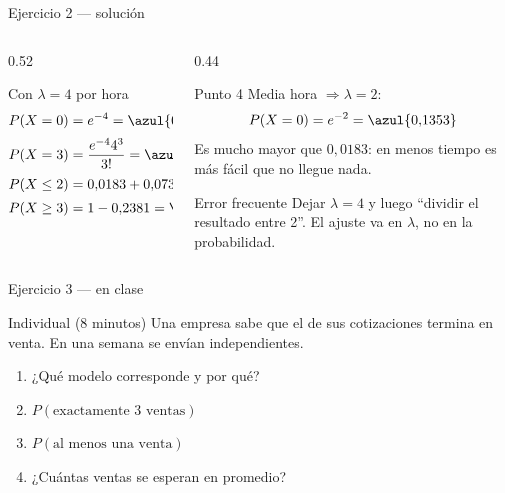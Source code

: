 \documentclass[aspectratio=169,10pt]{beamer}
\begin{document}
\begin{frame}{Ejercicio 2 — solución}
  \begin{columns}[T,onlytextwidth]
    \begin{column}{0.52\textwidth}
      \begin{block}{Con $\lambda=4$ por hora}
        \footnotesize
        \begin{align*}
          P(X=0)&=e^{-4}=\azul{0{,}0183}\\[0.2em]
          P(X=3)&=\frac{e^{-4}4^{3}}{3!}=\azul{0{,}1954}\\[0.2em]
          P(X\le 2)&=0{,}0183+0{,}0733+0{,}1465=\azul{0{,}2381}\\[0.2em]
          P(X\ge 3)&=1-0{,}2381=\azul{0{,}7619}
        \end{align*}
      \end{block}
    \end{column}
    \begin{column}{0.44\textwidth}
      \begin{exampleblock}{Punto 4}
        \footnotesize
        Media hora $\Rightarrow \lambda=2$:
        \[ P(X=0)=e^{-2}=\azul{0{,}1353} \]
        Es mucho mayor que $0{,}0183$: en menos tiempo es más fácil que no
        llegue nada.
      \end{exampleblock}
      \begin{alertblock}{Error frecuente}
        \footnotesize
        Dejar $\lambda=4$ y luego ``dividir el resultado entre 2''. El ajuste
        va en $\lambda$, no en la probabilidad.
      \end{alertblock}
    \end{column}
  \end{columns}
\end{frame}

\begin{frame}{Ejercicio 3 — en clase}
  \begin{alertblock}{Individual (8 minutos)}
    Una empresa sabe que el  de sus cotizaciones termina en
    venta. En una semana se envían  independientes.

    \vspace{0.25cm}
    \begin{enumerate}
      \item ¿Qué modelo corresponde y por qué?
      \item $P(\text{exactamente 3 ventas})$
      \item $P(\text{al menos una venta})$
      \item ¿Cuántas ventas se esperan en promedio?
    \end{enumerate}
  \end{alertblock}
\end{frame}
\end{document}
